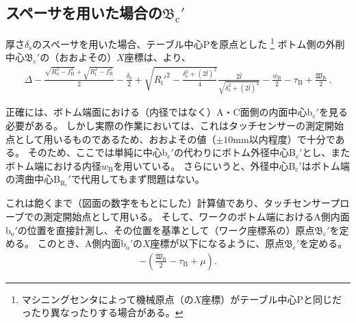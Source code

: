 \subsection[スペーサを用いた場合の\texorpdfstring{$\mathfrak B_\mathrm c'$}{Bc'}]
           {スペーサを用いた場合の$\boldsymbol{\mathfrak B_\mathrm c'}$}
厚さ$\delta_\mathrm s$のスペーサを用いた場合、テーブル中心Pを原点とした
\footnote{マシニングセンタによって機械原点（の$X$座標）がテーブル中心Pと同じだったり異なったりする場合がある。}\relax
ボトム側の外削中心$\mathfrak B_\mathrm c'$の（おおよその）$X$座標は、より、
\begin{align*}
  \Delta-\frac{\sqrt{R_\mathrm o^2-f_\mathrm B^2}+\sqrt{R_\mathrm i^2-f_\mathrm B^2}}2-\frac{\delta_\mathrm s}2
  +\sqrt{R_\mathrm i'^2-\frac{\delta_\mathrm s^2+(2\bar l)^2}4}\frac{2\bar l}{\sqrt{\delta_\mathrm s^2+(2\bar l)^2}}
  -\frac{w_\mathrm B}2-\tau_\mathrm B+\frac{\mathfrak W_\mathrm B}2\ .
\end{align*}
\begin{hosoku}
正確には、ボトム端面における（内径ではなく）A・C面側の内面中心b$_\mathrm c'$を見る必要がある。
しかし実際の作業においては、これはタッチセンサーの測定開始点として用いるものであるため、おおよその値（$\pm10$mm以内程度）で十分である。
そのため、ここでは単純に中心b$_\mathrm c'$の代わりにボトム外径中心B$_\mathrm c'$とし、またボトム端における内径$w_\mathrm B$を用いている。
さらにいうと、外径中心B$_\mathrm c'$はボトム端の湾曲中心B$_{\mathrm R_\mathrm c}'$で代用してもまず問題はない。
\end{hosoku}
これは飽くまで（図面の数字をもとにした）計算値であり、タッチセンサープローブでの測定開始点として用いる。
そして、ワークのボトム端におけるA側内面b$_\mathrm o'$の位置を直接計測し、その位置を基準として（ワーク座標系の）原点$\mathfrak B_\mathrm c'$を定める。
このとき、A側内面b$_\mathrm o'$の$X$座標が以下になるように、原点$\mathfrak B_\mathrm c'$を定める。
\begin{align*}
  -\left(\frac{\mathfrak W_\mathrm B}2-\tau_\mathrm B+\mu\right).
\end{align*}

